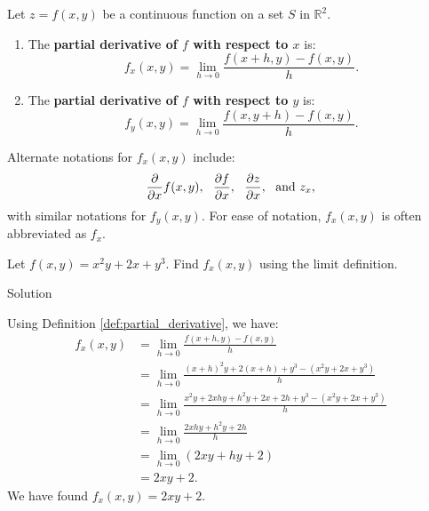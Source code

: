 \ifcalculus\pagebreak\fi
\begin{definition}\label{def:partial_derivative}
Let $z=f(x,y)$ be a continuous function on a set $S$ in $\mathbb{R}^2$.
\begin{enumerate}
	\item The \textbf{partial derivative of $f$ with respect to $x$} is:
	$$f_x(x,y) = \lim_{h\to 0} \frac{f(x+h,y) - f(x,y)}h.$$
	\item The \textbf{partial derivative of $f$ with respect to $y$} is:
	$$f_y(x,y) = \lim_{h\to 0} \frac{f(x,y+h) - f(x,y)}h.$$
	
	\end{enumerate}
\end{definition}

Alternate notations for $f_x(x,y)$ include: $$\frac{\partial}{\partial x}f(x,y),\ \ \frac{\pf}{\px},\ \ \frac{\pz}{\px},\ \ \text{and}\ z_x,$$ with similar notations for $f_y(x,y).$ For ease of notation, $f_x(x,y)$ is often abbreviated as $f_x$.

\ifanalysis
\begin{example}\label{ex_partial1}

Let $f(x,y) = x^2y + 2x+y^3$. Find $f_x(x,y)$ using the limit definition.

Solution 

Using Definition \ref{def:partial_derivative}, we have:
\begin{align*}
f_x(x,y) &= \lim_{h\to 0} \frac{f(x+h,y) - f(x,y)}{h} \\
				&= \lim_{h\to 0} \frac{(x+h)^2y+2(x+h)+y^3 - (x^2y+2x+y^3)}{h}\\
				&= \lim_{h\to 0} \frac{x^2y+2xhy+h^2y+2x+2h+y^3-(x^2y+2x+y^3)}{h}\\
				&= \lim_{h\to 0} \frac{2xhy+h^2y+2h}{h}\\
				&=\lim_{h\to 0} \left(2xy+hy+2 \right)\\
				&= 2xy+2.
\end{align*}
We have found $f_x(x,y) = 2xy+2$.

\end{example}
\fi

